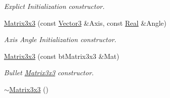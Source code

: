 \begin{DoxyCompactItemize}
\begin{DoxyCompactList}\small\item\em Explict Initialization constructor. \item\end{DoxyCompactList}\item 
\hyperlink{classMezzanine_1_1Matrix3x3_a991f4d9ee4ce95a89a463e91fd54cc79}{Matrix3x3} (const \hyperlink{classMezzanine_1_1Vector3}{Vector3} \&Axis, const \hyperlink{namespaceMezzanine_a726731b1a7df72bf3583e4a97282c6f6}{Real} \&Angle)
\begin{DoxyCompactList}\small\item\em Axis Angle Initialization constructor. \item\end{DoxyCompactList}\item 
\hyperlink{classMezzanine_1_1Matrix3x3_aed7657c367ebc33ee866419ef2b0ab44}{Matrix3x3} (const btMatrix3x3 \&Mat)
\begin{DoxyCompactList}\small\item\em Bullet \hyperlink{classMezzanine_1_1Matrix3x3}{Matrix3x3} constructor. \item\end{DoxyCompactList}\item 
\hypertarget{classMezzanine_1_1Matrix3x3_af48e56ff2d500684f26f0b72df9e63c1}{
\hyperlink{classMezzanine_1_1Matrix3x3_af48e56ff2d500684f26f0b72df9e63c1}{$\sim$Matrix3x3} ()}
\label{classMezzanine_1_1Matrix3x3_af48e56ff2d500684f26f0b72df9e63c1}


\end{DoxyCompactItemize}
